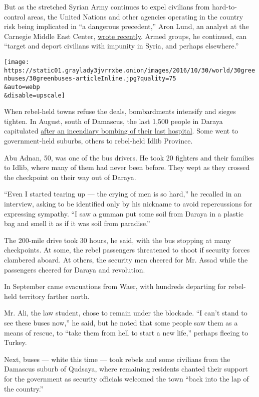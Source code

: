 But as the stretched Syrian Army continues to expel civilians from
hard-to-control areas, the United Nations and other agencies operating
in the country risk being implicated in ``a dangerous precedent,'' Aron
Lund, an analyst at the Carnegie Middle East Center,
\href{http://carnegie-mec.org/diwan/64498?lang=en}{wrote recently}.
Armed groups, he continued, can ``target and deport civilians with
impunity in Syria, and perhaps elsewhere.''

\texttt{[image: https://static01.graylady3jvrrxbe.onion/images/2016/10/30/world/30greenbuses/30greenbuses-articleInline.jpg?quality=75\\\&auto=webp\\\&disable=upscale]}

When rebel-held towns refuse the deals, bombardments intensify and
sieges tighten. In August, south of Damascus, the last 1,500 people in
Daraya capitulated
\href{http://www.nytimes3xbfgragh.onion/2016/08/26/world/middleeast/daraya-syria-assad-surrender.html}{after
an incendiary bombing of their last hospital}. Some went to
government-held suburbs, others to rebel-held Idlib Province.

Abu Adnan, 50, was one of the bus drivers. He took 20 fighters and their
families to Idlib, where many of them had never been before. They wept
as they crossed the checkpoint on their way out of Daraya.

``Even I started tearing up --- the crying of men is so hard,'' he
recalled in an interview, asking to be identified only by his nickname
to avoid repercussions for expressing sympathy. ``I saw a gunman put
some soil from Daraya in a plastic bag and smell it as if it was soil
from paradise.''

The 200-mile drive took 30 hours, he said, with the bus stopping at many
checkpoints. At some, the rebel passengers threatened to shoot if
security forces clambered aboard. At others, the security men cheered
for Mr. Assad while the passengers cheered for Daraya and revolution.

In September came evacuations from Waer, with hundreds departing for
rebel-held territory farther north.

Mr. Ali, the law student, chose to remain under the blockade. ``I can't
stand to see these buses now,'' he said, but he noted that some people
saw them as a means of rescue, to ``take them from hell to start a new
life,'' perhaps fleeing to Turkey.

Next, buses --- white this time --- took rebels and some civilians from
the Damascus suburb of Qudsaya, where remaining residents chanted their
support for the government as security officials welcomed the town
``back into the lap of the country.''

